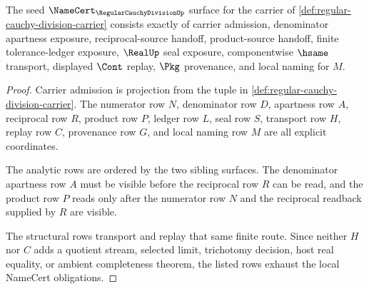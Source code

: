 \begin{theorem}
\label{thm:regular-cauchy-division-namecert-obligations}
The seed $\NameCert_{\RegularCauchyDivisionUp}$ surface for the carrier of \autoref{def:regular-cauchy-division-carrier} consists exactly of carrier admission, denominator apartness exposure, reciprocal-source handoff, product-source handoff, finite tolerance-ledger exposure, $\RealUp$ seal exposure, componentwise $\hsame$ transport, displayed $\Cont$ replay, $\Pkg$ provenance, and local naming for $M$.
\end{theorem}
\begin{proof}
Carrier admission is projection from the tuple in \autoref{def:regular-cauchy-division-carrier}. The numerator row $N$, denominator row $D$, apartness row $A$, reciprocal row $R$, product row $P$, ledger row $L$, seal row $S$, transport row $H$, replay row $C$, provenance row $G$, and local naming row $M$ are all explicit coordinates.

The analytic rows are ordered by the two sibling surfaces. The denominator apartness row $A$ must be visible before the reciprocal row $R$ can be read, and the product row $P$ reads only after the numerator row $N$ and the reciprocal readback supplied by $R$ are visible.

The structural rows transport and replay that same finite route. Since neither $H$ nor $C$ adds a quotient stream, selected limit, trichotomy decision, host real equality, or ambient completeness theorem, the listed rows exhaust the local NameCert obligations.
\end{proof}


